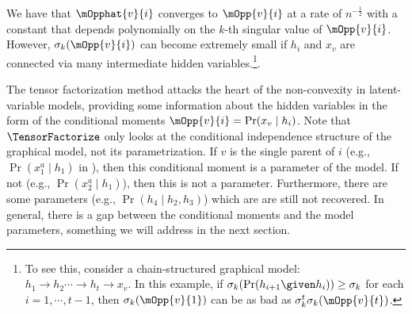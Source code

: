   We have that $\mOpphat{v}{i}$
  converges to $\mOpp{v}{i}$ at a rate of $n^{-\frac12}$ with a constant
  that depends polynomially on the $k$-th singular value of
  $\mOpp{v}{i}$.
However, $\sigma_{k}(\mOpp{v}{i})$ can become extremely
small if $h_i$ and $x_v$ are connected via many intermediate hidden
variables.\footnote{To see this, consider a chain-structured graphical model:
$h_1 \to h_2 \cdots \to h_t \to x_v$. In this example, if
$\sigma_k(\Pr(h_{i+1} \given h_{i})) \ge \sigma_k$ for each $i = 1,
\cdots, t-1$, then $\sigma_k(\mOpp{v}{1})$ can be as bad as
$\sigma_k^t \sigma_k(\mOpp{v}{t})$.}.

The tensor factorization method attacks the heart of the non-convexity
  in latent-variable models, providing some information about the hidden variables
  in the form of the conditional moments $\mOpp{v}{i} = \Pr(x_v \mid h_i)$.
  Note that $\TensorFactorize$ only looks at the conditional independence structure
  of the graphical model, not its parametrization.
  If $v$ is the single parent of $i$ (e.g., $\Pr(x_1^a \mid h_1)$ in ),
  then this conditional moment is a parameter of the model.
  If not (e.g., $\Pr(x_2^a \mid h_1)$), then this is not a parameter.
  Furthermore, there are some parameters (e.g., $\Pr(h_4 \mid h_2, h_3)$) which are
  are still not recovered.
  In general, there is a gap between the conditional moments
  and the model parameters,
  something we will address in the next section.

